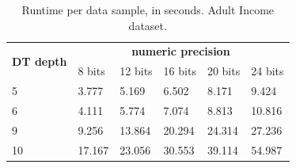 \begin{table}[H]
\centering
\caption{Runtime per data sample, in seconds. Adult Income dataset.}
\label{table:runtimeDTAI}
\begin{tabular}{|l|l|l|l|l|l|}
\hline
\multirow{2}{*}{\textbf{DT depth}} & \multicolumn{5}{c|}{\textbf{numeric precision}}         \\ \cline{2-6} 
                          & 8 bits & 12 bits & 16 bits & 20 bits & 24 bits \\ \hline
5                         & 3.777  & 5.169   & 6.502   & 8.171   & 9.424   \\ \hline
6                         & 4.111  & 5.774   & 7.074   & 8.813   & 10.816  \\ \hline
9                         & 9.256  & 13.864  & 20.294  & 24.314  & 27.236  \\ \hline
10                        & 17.167 & 23.056  & 30.553  & 39.114  & 54.987  \\ \hline
\end{tabular}
\end{table}


